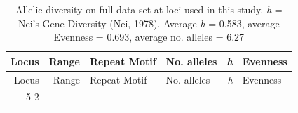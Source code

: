 \documentclass[fleqn,10pt,lineno]{wlpeerj} %
\theoremstyle{definition}
\theoremstyle{definition}
\theoremstyle{definition}
\theoremstyle{remark}
\begin{document}
\begin{longtable}[]{@{}rrllrl@{}}
\caption{\label{tab:locus-stats} Allelic diversity on full data set at loci
used in this study. \emph{h} = Nei's Gene Diversity (Nei, 1978). Average
\emph{h} = 0.583, average Evenness = 0.693, average no. alleles =
6.27}\tabularnewline
\toprule
\begin{minipage}[b]{0.08\columnwidth}\raggedleft\strut
Locus\strut
\end{minipage} & \begin{minipage}[b]{0.10\columnwidth}\raggedleft\strut
Range\strut
\end{minipage} & \begin{minipage}[b]{0.15\columnwidth}\raggedright\strut
Repeat Motif\strut
\end{minipage} & \begin{minipage}[b]{0.14\columnwidth}\raggedright\strut
No. alleles\strut
\end{minipage} & \begin{minipage}[b]{0.06\columnwidth}\raggedleft\strut
\emph{h}\strut
\end{minipage} & \begin{minipage}[b]{0.10\columnwidth}\raggedright\strut
Evenness\strut
\end{minipage}\tabularnewline
\midrule
\endfirsthead
\toprule
\begin{minipage}[b]{0.08\columnwidth}\raggedleft\strut
Locus\strut
\end{minipage} & \begin{minipage}[b]{0.10\columnwidth}\raggedleft\strut
Range\strut
\end{minipage} & \begin{minipage}[b]{0.15\columnwidth}\raggedright\strut
Repeat Motif\strut
\end{minipage} & \begin{minipage}[b]{0.14\columnwidth}\raggedright\strut
No. alleles\strut
\end{minipage} & \begin{minipage}[b]{0.06\columnwidth}\raggedleft\strut
\emph{h}\strut
\end{minipage} & \begin{minipage}[b]{0.10\columnwidth}\raggedright\strut
Evenness\strut
\end{minipage}\tabularnewline
\midrule
\endhead
\begin{minipage}[t]{0.08\columnwidth}\raggedleft\strut
5-2\strut
\end{minipage} & \begin{minipage}[t]{0.10\columnwidth}\raggedleft\strut

\end{minipage}
\end{longtable}
\end{document}
